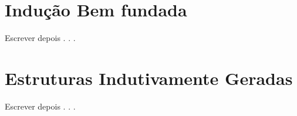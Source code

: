 \section{Indução Bem fundada}\label{sec:InducaoBoaOrdem}

Escrever depois . . . 

\section{Estruturas Indutivamente Geradas}\label{sec:InducaoEstrutural}

Escrever depois . . .